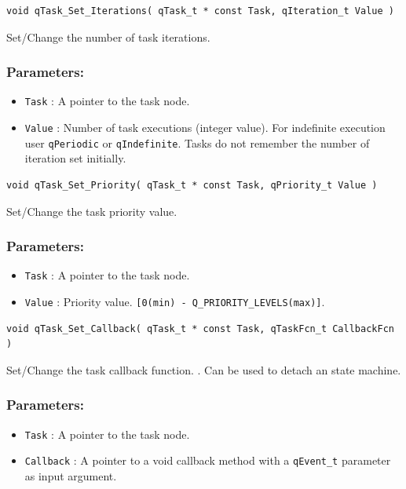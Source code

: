 \documentclass{article}
\begin{document}
\noindent\hrulefill

\begin{lstlisting}[style=CStyle]
void qTask_Set_Iterations( qTask_t * const Task, qIteration_t Value )
\end{lstlisting}

Set/Change the number of task iterations. 

\subsubsection*{Parameters:}
\begin{itemize}
    \item \lstinline{Task} : A pointer to the task node.
    \item \lstinline{Value} : Number of task executions (integer value). For indefinite execution user \lstinline{qPeriodic} or \lstinline{qIndefinite}. Tasks do not remember the number of iteration set initially. 
\end{itemize}

\noindent\hrulefill


\begin{lstlisting}[style=CStyle]
void qTask_Set_Priority( qTask_t * const Task, qPriority_t Value )
\end{lstlisting}

Set/Change the task priority value. 

\subsubsection*{Parameters:}
\begin{itemize}
    \item \lstinline{Task} : A pointer to the task node.
    \item \lstinline{Value} : Priority value. \lstinline{[0(min) - Q_PRIORITY_LEVELS(max)]}. 
\end{itemize}

\noindent\hrulefill


\begin{lstlisting}[style=CStyle]
void qTask_Set_Callback( qTask_t * const Task, qTaskFcn_t CallbackFcn )
\end{lstlisting}

Set/Change the task callback function. . Can be used to detach an state machine.

\subsubsection*{Parameters:}
\begin{itemize}
    \item \lstinline{Task} : A pointer to the task node.
    \item \lstinline{Callback} : A pointer to a void callback method with a \lstinline{qEvent_t} parameter as input argument.
\end{itemize}
\end{document}
